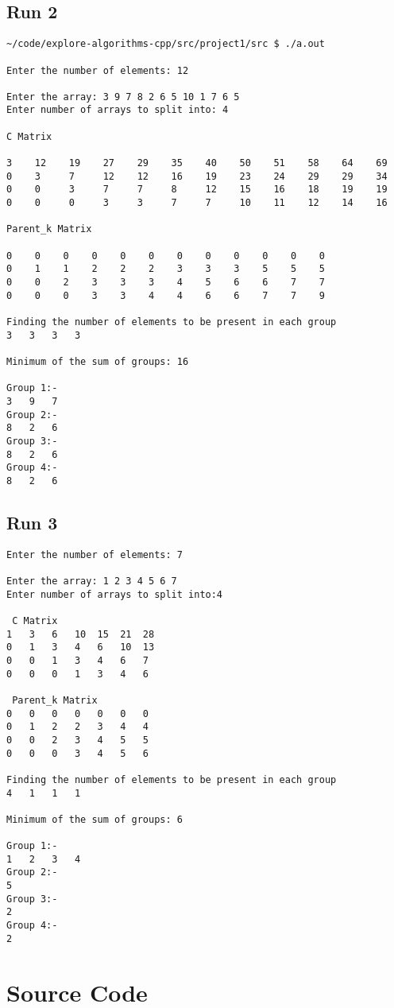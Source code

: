 \documentclass{article}
\begin{document}
\subsection{Run 2}
\begin{verbatim}
~/code/explore-algorithms-cpp/src/project1/src $ ./a.out 

Enter the number of elements: 12

Enter the array: 3 9 7 8 2 6 5 10 1 7 6 5
Enter number of arrays to split into: 4

C Matrix

3    12    19    27    29    35    40    50    51    58    64    69    
0    3     7     12    12    16    19    23    24    29    29    34    
0    0     3     7     7     8     12    15    16    18    19    19    
0    0     0     3     3     7     7     10    11    12    14    16    

Parent_k Matrix

0    0    0    0    0    0    0    0    0    0    0    0    
0    1    1    2    2    2    3    3    3    5    5    5    
0    0    2    3    3    3    4    5    6    6    7    7    
0    0    0    3    3    4    4    6    6    7    7    9    

Finding the number of elements to be present in each group
3	3	3	3

Minimum of the sum of groups: 16

Group 1:-
3	9	7	
Group 2:-
8	2	6	
Group 3:-
8	2	6	
Group 4:-
8	2	6	
\end{verbatim}

\subsection{Run 3}
\begin{verbatim}
Enter the number of elements: 7

Enter the array: 1 2 3 4 5 6 7
Enter number of arrays to split into:4

 C Matrix 
1	3	6	10	15	21	28	
0	1	3	4	6	10	13	
0	0	1	3	4	6	7	
0	0	0	1	3	4	6	

 Parent_k Matrix 
0	0	0	0	0	0	0	
0	1	2	2	3	4	4	
0	0	2	3	4	5	5	
0	0	0	3	4	5	6	

Finding the number of elements to be present in each group
4	1	1	1

Minimum of the sum of groups: 6

Group 1:-
1	2	3	4	
Group 2:-
5	
Group 3:-
2	
Group 4:-
2	
\end{verbatim}

\section{Source Code}
\end{document}

